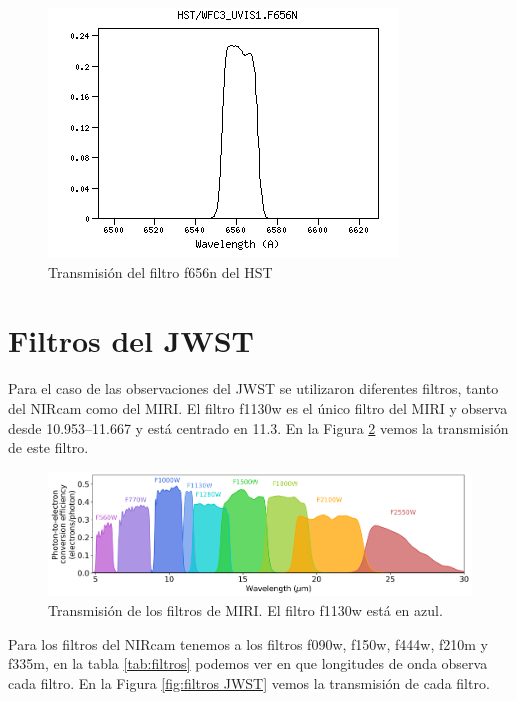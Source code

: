 \documentclass{book}
\begin{document}
\begin{figure}
    \centering
    \includegraphics[width=\textwidth]{Appendices/HST_WFC3_UVIS1.F656N.png}
    \caption{Transmisión del filtro f656n del HST}
    \label{fig:filtro f656n}
\end{figure}

\section{Filtros del JWST}\label{AP S:JWST}

Para el caso de las observaciones del JWST se utilizaron diferentes filtros, tanto del NIRcam como del MIRI. El filtro f1130w es el único filtro del MIRI y observa desde 10.953--\SI{11.667}{\mum} y está centrado en \SI{11.3}{\mum}. En la Figura \ref{fig:filtos MIRI} vemos la transmisión de este filtro.

\begin{figure}
    \centering
    \includegraphics[width=\textwidth]{Appendices/miri_img_pces_ETC4.0.png}
    \caption{Transmisión de los filtros de MIRI. El filtro f1130w está en azul.}
    \label{fig:filtos MIRI}
\end{figure}

Para los filtros del NIRcam  tenemos a los filtros f090w, f150w, f444w, f210m y f335m, en la tabla \ref{tab:filtros} podemos ver en que longitudes de onda observa cada filtro. En la Figura \ref{fig:filtros JWST} vemos la transmisión de cada filtro. 
\end{document}
